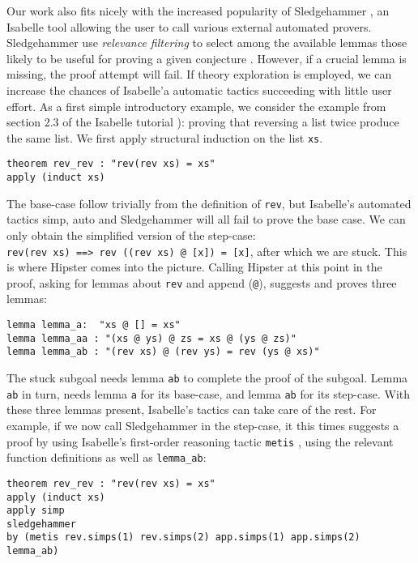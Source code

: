 Our work also fits nicely with the increased popularity of Sledgehammer \cite{sledgehammer}, an Isabelle tool allowing the user to call various external automated provers. Sledgehammer use \emph{relevance filtering} to select among the available lemmas those likely to be useful for proving a given conjecture \cite{mash}. However, if a crucial lemma is missing, the proof attempt will fail. If theory exploration is employed, we can increase the chances of Isabelle'a automatic tactics succeeding with little user effort. As a first simple introductory example, we consider the example from section 2.3 of the Isabelle tutorial \cite{isabelle}): proving that reversing a list twice produce the same list. We first apply structural induction on the list \texttt{xs}.
\begin{verbatim}
theorem rev_rev : "rev(rev xs) = xs"
apply (induct xs)
\end{verbatim}
The base-case follow trivially from the definition of \texttt{rev}, but Isabelle's automated tactics simp, auto and Sledgehammer will all fail to prove the base case. We can only obtain the simplified version of the step-case: \\\texttt{rev(rev xs) ==> rev ((rev xs) @ [x]) = [x]}, after which we are stuck. This is where Hipster comes into the picture. Calling Hipster at this point in the proof, asking for lemmas about \texttt{rev} and append (\texttt{@}), suggests and proves three lemmas: 
\begin{verbatim}
lemma lemma_a:  "xs @ [] = xs"
lemma lemma_aa : "(xs @ ys) @ zs = xs @ (ys @ zs)"
lemma lemma_ab : "(rev xs) @ (rev ys) = rev (ys @ xs)"
\end{verbatim}
The stuck subgoal needs lemma \texttt{ab} to complete the proof of the subgoal. Lemma \texttt{ab} in turn, needs lemma \texttt{a} for its base-case, and lemma \texttt{ab} for its step-case. With these three lemmas present, Isabelle's tactics can take care of the rest. For example, if we now call Sledgehammer in the step-case, it this times suggests a proof by using Isabelle's first-order reasoning tactic \texttt{metis} \cite{metis}, using the relevant function definitions as well as \texttt{lemma\_ab}:
\begin{small}
\begin{verbatim}
theorem rev_rev : "rev(rev xs) = xs"
apply (induct xs)
apply simp
sledgehammer
by (metis rev.simps(1) rev.simps(2) app.simps(1) app.simps(2) lemma_ab)
\end{verbatim}
\end{small}

